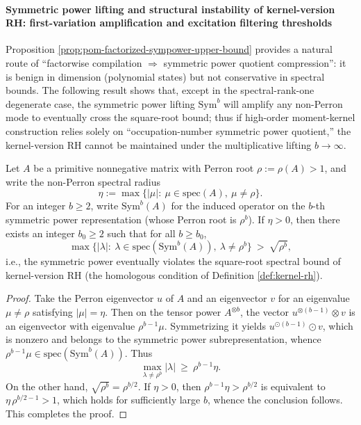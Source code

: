 \paragraph{Symmetric power lifting and structural instability of kernel-version RH: first-variation amplification and excitation filtering thresholds}
Proposition \ref{prop:pom-factorized-sympower-upper-bound} provides a natural route of ``factorwise compilation \(\Rightarrow\) symmetric power quotient compression'': it is benign in dimension (polynomial states) but not conservative in spectral bounds.
The following result shows that, except in the spectral-rank-one degenerate case, the symmetric power lifting \(\mathrm{Sym}^b\) will amplify any non-Perron mode to eventually cross the square-root bound; thus if high-order moment-kernel construction relies solely on ``occupation-number symmetric power quotient,'' the kernel-version RH cannot be maintained under the multiplicative lifting \(b\to\infty\).

\begin{theorem}\label{thm:pom-sympower-sqrt-bound-instability}
Let \(A\) be a primitive nonnegative matrix with Perron root \(\rho:=\rho(A)>1\), and write the non-Perron spectral radius
\[
\eta:=\max\bigl\{|\mu|:\ \mu\in\mathrm{spec}(A),\ \mu\ne \rho\bigr\}.
\]
For an integer \(b\ge 2\), write \(\mathrm{Sym}^b(A)\) for the induced operator on the \(b\)-th symmetric power representation (whose Perron root is \(\rho^b\)).
If \(\eta>0\), then there exists an integer \(b_0\ge 2\) such that for all \(b\ge b_0\),
\[
\max\bigl\{|\lambda|:\ \lambda\in\mathrm{spec}(\mathrm{Sym}^b(A)),\ \lambda\ne\rho^b\bigr\}\ >\ \sqrt{\rho^b},
\]
i.e., the symmetric power eventually violates the square-root spectral bound of kernel-version RH (the homologous condition of Definition \ref{def:kernel-rh}).
\end{theorem}
\begin{proof}
Take the Perron eigenvector \(u\) of \(A\) and an eigenvector \(v\) for an eigenvalue \(\mu\ne\rho\) satisfying \(|\mu|=\eta\).
Then on the tensor power \(A^{\otimes b}\), the vector \(u^{\otimes(b-1)}\otimes v\) is an eigenvector with eigenvalue \(\rho^{b-1}\mu\).
Symmetrizing it yields \(u^{\odot(b-1)}\odot v\), which is nonzero and belongs to the symmetric power subrepresentation, whence
\(\rho^{b-1}\mu\in\mathrm{spec}(\mathrm{Sym}^b(A))\).
Thus
\[
\max_{\lambda\ne\rho^b}|\lambda|\ \ge\ \rho^{b-1}\eta.
\]
On the other hand, \(\sqrt{\rho^b}=\rho^{b/2}\).
If \(\eta>0\), then \(\rho^{b-1}\eta>\rho^{b/2}\) is equivalent to \(\eta\,\rho^{b/2-1}>1\), which holds for sufficiently large \(b\), whence the conclusion follows. This completes the proof.
\end{proof}

